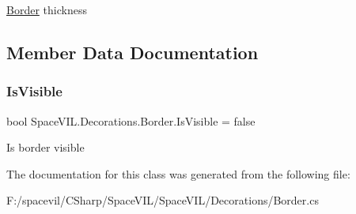 \mbox{\hyperlink{class_space_v_i_l_1_1_decorations_1_1_border}{Border}} thickness 



\subsection{Member Data Documentation}
\mbox{\label{class_space_v_i_l_1_1_decorations_1_1_border_a47746be2515f5c1e5164836c42665bac}} 
\subsubsection{\texorpdfstring{Is\+Visible}{IsVisible}}
{\footnotesize\ttfamily bool Space\+V\+I\+L.\+Decorations.\+Border.\+Is\+Visible = false}



Is border visible 



The documentation for this class was generated from the following file\+:\begin{DoxyCompactItemize}
\item 
F\+:/spacevil/\+C\+Sharp/\+Space\+V\+I\+L/\+Space\+V\+I\+L/\+Decorations/Border.\+cs\end{DoxyCompactItemize}

